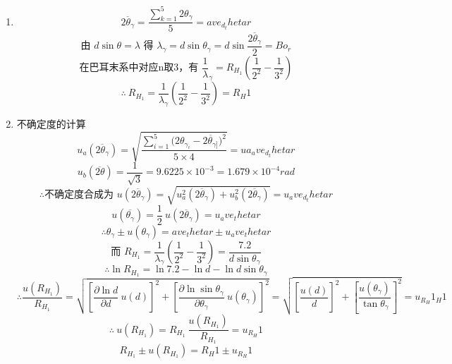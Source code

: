 \begin{enumerate}
  \item { }
      $$\overline{2{\theta}_{\gamma}} = \displaystyle\frac{\sum_{k=1}^5 2{\theta}_{\gamma}}{5} = {{ave_d_thetar}}$$
      $$\displaystyle\text{由\ }d\sin{\theta} = {\lambda}\text{\ 得\ }{\lambda}_{\gamma} = d\sin{\theta}_{\gamma} = d\sin{\frac{\overline{2{\theta}_{\gamma}}}{2}} = {{Bo_r}}$$
      $$\displaystyle\text{在巴耳末系中对应n取3，有\ }\frac{1}{\lambda}_{\gamma} = R_{H_1}\left(\frac{1}{2^2}-\frac{1}{3^2}\right)$$
      $$\therefore\ \displaystyle R_{H_{1}} = \frac{1}{ {\lambda}_{\gamma}}\left(\frac{1}{2^2}-\frac{1}{3^2}\right) = {{R_H1}}$$
  \item {不确定度的计算}
      $$u_a(\overline{2{\theta}_{\gamma}}) = \displaystyle\sqrt{\frac{\sum_{i=1}^{5} {(2{\theta}_{ {\gamma}_{i}}-\overline{2{\theta}_{\gamma]}}})^2}{5\times4}}={{ua_ave_d_thetar}}$$
      $$u_b(\overline{2\theta}) = \displaystyle\frac{1}{\sqrt3} = 9.6225\times10^{-3} = 1.679 \times 10^{-4} rad$$
      $$\therefore\text{不确定度合成为\ }u(\overline{2{\theta}_{\gamma}}) = \sqrt{u_a^2(\overline{2{\theta}_{\gamma}})+u_b^2(\overline{2{\theta}_{\gamma}})} = {{u_ave_d_thetar}}$$
      $$u(\overline{ {\theta}_{\gamma}})= \displaystyle\frac12\ u(\overline{2{\theta}_{\gamma}}) = {{u_ave_thetar}}$$
      $$\therefore{\theta}_{\gamma} \pm u({\theta}_{\gamma}) = {{ave_thetar}} \pm {{u_ave_thetar}}$$
      $$\text{而\ }\displaystyle R_{H_1} = \frac{1}{ {\lambda}_{\gamma}}\left(\frac{1}{2^2}-\frac{1}{3^2}\right) = \frac{7.2}{d\sin{\theta}_{\gamma}}$$
      $$\therefore\ln{R_{H_1}} = \ln{7.2} -\ln{d} - \ln{d\sin{\theta}_{\gamma}}$$
      $$\therefore\displaystyle \frac{u(R_{H_1})}{R_{H_1}} = \sqrt{ {\left[\frac{\partial{\ln{d}}}{\partial{d}}\ u(d)\right]}^2 + {\left[\frac{\partial{\ln{\sin{ {\theta}_{\gamma}}}}}{\partial{ {\theta}_{\gamma}}}\ u({\theta}_{\gamma})\right]}^2} = \sqrt{  {\left[\frac{u(d)}{d}\right]}^2 + {\left[\frac{u({\theta}_{\gamma})}{\tan{ {\theta}_{\gamma}}}\right]}^2} = {{u_R_H1_H1}}$$
      $$\therefore \ u(R_{H_1}) = \displaystyle R_{H_1}\ \frac{u(R_{H_1})}{R_{H_1}} = {{u_R_H1}}$$ 
      $$R_{H_1} \pm u(R_{H_1}) = {{R_H1}} \pm {{u_R_H1}}$$
\end{enumerate}

